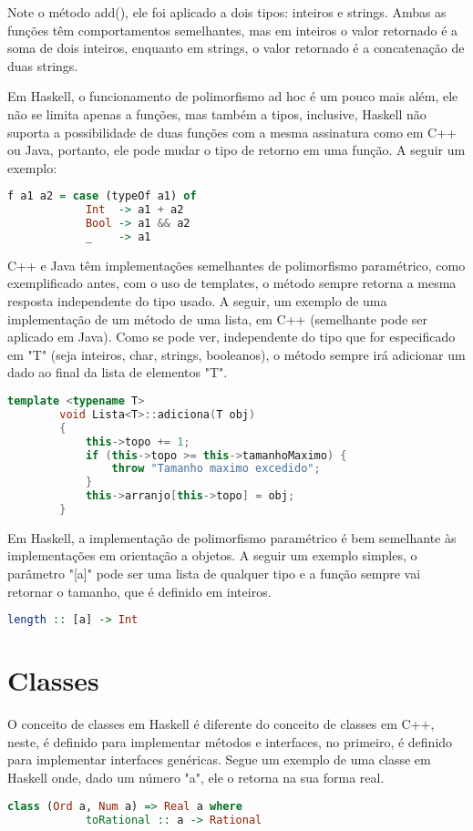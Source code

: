 \documentclass{article}
\begin{document}
    Note o método add(), ele foi aplicado a dois tipos: inteiros e strings. Ambas as funções têm comportamentos semelhantes, mas em inteiros o valor retornado é a soma de dois inteiros, enquanto em strings, o valor retornado é a concatenação de duas strings.
        
    Em Haskell, o funcionamento de polimorfismo ad hoc é um pouco mais além, ele não se limita apenas a funções, mas também a tipos, inclusive, Haskell não suporta a possibilidade de duas funções com a mesma assinatura como em C++ ou Java, portanto, ele pode mudar o tipo de retorno em uma função. A seguir um exemplo:
    \begin{lstlisting}[language=Haskell, frame=single]
    f a1 a2 = case (typeOf a1) of
            Int  -> a1 + a2
            Bool -> a1 && a2
            _    -> a1
    \end{lstlisting}
        
    \newpage
    C++ e Java têm implementações semelhantes de polimorfismo paramétrico, como exemplificado antes, com o uso de templates, o método sempre retorna a mesma resposta independente do tipo usado. A seguir, um exemplo de uma implementação de um método de uma lista, em C++ (semelhante pode ser aplicado em Java). Como se pode ver, independente do tipo que for especificado em "T" (seja inteiros, char, strings, booleanos), o método sempre irá adicionar um dado ao final da lista de elementos "T".
    \begin{lstlisting}[language=C++, frame=single]
        template <typename T>
        void Lista<T>::adiciona(T obj)
        {
            this->topo += 1;
            if (this->topo >= this->tamanhoMaximo) {
                throw "Tamanho maximo excedido";
            }
            this->arranjo[this->topo] = obj;
        }
    \end{lstlisting}
        
    Em Haskell, a implementação de polimorfismo paramétrico é bem semelhante às implementações em orientação a objetos. A seguir um exemplo simples, o parâmetro "[a]" pode ser uma lista de qualquer tipo e a função sempre vai retornar o tamanho, que é definido em inteiros. 
    \begin{lstlisting}[language=Haskell, frame=single]
        length :: [a] -> Int
    \end{lstlisting}
        
\section*{Classes}
    O conceito de classes em Haskell é diferente do conceito de classes em C++, neste, é definido para implementar métodos e interfaces, no primeiro, é definido para implementar interfaces genéricas. Segue um exemplo de uma classe em Haskell onde, dado um número "a", ele o retorna na sua forma real.
    \begin{lstlisting}[language=Haskell, frame=single]
        class (Ord a, Num a) => Real a where
            toRational :: a -> Rational
    \end{lstlisting}
        
\end{document}
